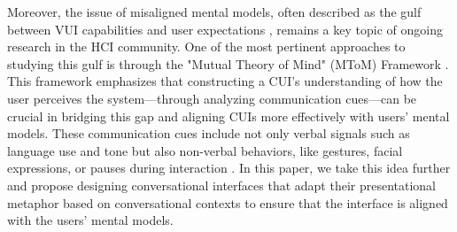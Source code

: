 Moreover, the issue of misaligned mental models, often described as the gulf between VUI capabilities and user expectations \cite{Luger_Sellen_2016}, remains a key topic of ongoing research in the HCI community. One of the most pertinent approaches to studying this gulf is through the "Mutual Theory of Mind" (MToM) Framework \cite{Wang_Goel_2022}. This framework emphasizes that constructing a CUI’s understanding of how the user perceives the system—through analyzing communication cues—can be crucial in bridging this gap and aligning CUIs more effectively with users' mental models. These communication cues include not only verbal signals such as language use and tone \cite{Wang_Saha_Gregori_Joyner_Goel_2021} but also non-verbal behaviors, like gestures, facial expressions, or pauses during interaction \cite{Chan_Fu_Li_Yao_Desai_Prpa_Wang_2024}. In this paper, we take this idea further and propose designing conversational interfaces that adapt their presentational metaphor based on conversational contexts to ensure that the interface is aligned with the users' mental models.